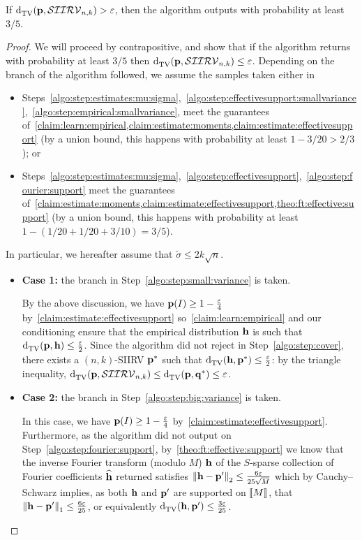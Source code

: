 \begin{lemma}\label{lemma:soundness}
  If $ \totalvardist{\p}{\classksiirv[n]{k}} > \eps$, then the algorithm outputs \reject with probability at least $3/5$.
\end{lemma}
\begin{proof}
We will proceed by contrapositive, and show that if the algorithm returns \accept with probability at least $3/5$ then $ \totalvardist{\p}{\classksiirv[n]{k}} \leq \eps$. 
Depending on the branch of the algorithm followed, we assume the samples taken either in
 \begin{itemize}
    \item Steps~\ref{algo:step:estimates:mu:sigma},~\ref{algo:step:effectivesupport:smallvariance},~\ref{algo:step:empirical:smallvariance}, meet the guarantees of~\cref{claim:learn:empirical,claim:estimate:moments,claim:estimate:effectivesupport} (by a union bound, this happens with probability at least $1-3/20 > 2/3$); or
    \item Steps~\ref{algo:step:estimates:mu:sigma},~\ref{algo:step:effectivesupport},~\ref{algo:step:fourier:support} meet the guarantees of~\cref{claim:estimate:moments,claim:estimate:effectivesupport,theo:ft:effective:support} (by a union bound, this happens with probability at least $1-(1/20+1/20+3/10)=3/5$).
 \end{itemize}
In particular, we hereafter assume that $\widetilde{\sigma} \leq 2k\sqrt{n}$.

\begin{itemize}
\item \textbf{Case 1:} the branch in Step~\ref{algo:step:small:variance} is taken.

  By the above discussion, we have $\p(I)\geq 1 - \frac{\eps}{4}$ by~\cref{claim:estimate:effectivesupport} so~\cref{claim:learn:empirical} and our conditioning ensure that the empirical distribution $\h$ is such that $\totalvardist{\p}{\h} \leq \frac{\eps}{2}$. Since the algorithm did not reject in Step~\ref{algo:step:cover}, there exists a $(n,k)$-SIIRV $\p^\ast$ such that $\totalvardist{\h}{\p^\ast} \leq \frac{\eps}{2}$: by the triangle inequality, $ \totalvardist{\p}{\classksiirv[n]{k}} \leq \totalvardist{\p}{\q^\ast} \leq \eps$.


\item \textbf{Case 2:} the branch in Step~\ref{algo:step:big:variance} is taken.

  In this case, we have $\p(I)\geq 1 - \frac{\eps}{4}$ by~\cref{claim:estimate:effectivesupport}. Furthermore, as the algorithm did not output \reject on Step~\ref{algo:step:fourier:support}, by~\cref{theo:ft:effective:support} we know that the inverse Fourier transform (modulo $M$) $\h$ of the $S$-sparse collection of Fourier coefficients $\fourier{\h}$ returned satisfies
  $
       \normtwo{\h-\p'} \leq \frac{6\eps}{25\sqrt{M}}
  $ 
  which by Cauchy--Schwarz implies, as both $\h$ and $\p'$ are supported on $\modulo{M}$, that $\normone{\h-\p'}\leq \frac{6\eps}{25}$, or equivalently $\totalvardist{\h}{\p'}\leq \frac{3\eps}{25}$.
  

\end{itemize}
\end{proof}
